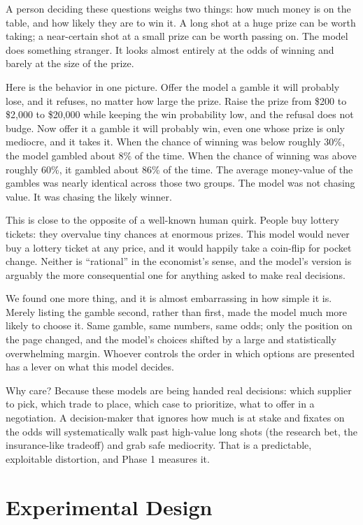 \documentclass[11pt]{article}
\begin{document}
A person deciding these questions weighs two things: how much money is on the table, and how likely
they are to win it. A long shot at a huge prize can be worth taking; a near-certain shot at a small
prize can be worth passing on. The model does something stranger. It looks almost entirely at the
odds of winning and barely at the size of the prize.

Here is the behavior in one picture. Offer the model a gamble it will probably lose, and it refuses,
no matter how large the prize. Raise the prize from \$200 to \$2{,}000 to \$20{,}000 while keeping
the win probability low, and the refusal does not budge. Now offer it a gamble it will probably win,
even one whose prize is only mediocre, and it takes it. When the chance of winning was below roughly
30\%, the model gambled about 8\% of the time. When the chance of winning was above roughly 60\%, it
gambled about 86\% of the time. The average money-value of the gambles was nearly identical across
those two groups. The model was not chasing value. It was chasing the likely winner.

This is close to the opposite of a well-known human quirk. People buy lottery tickets: they
overvalue tiny chances at enormous prizes. This model would never buy a lottery ticket at any price,
and it would happily take a coin-flip for pocket change. Neither is ``rational'' in the economist's
sense, and the model's version is arguably the more consequential one for anything asked to make real
decisions.

We found one more thing, and it is almost embarrassing in how simple it is. Merely listing the
gamble second, rather than first, made the model much more likely to choose it. Same gamble, same
numbers, same odds; only the position on the page changed, and the model's choices shifted by a large
and statistically overwhelming margin. Whoever controls the order in which options are presented has a
lever on what this model decides.

Why care? Because these models are being handed real decisions: which supplier to pick, which trade
to place, which case to prioritize, what to offer in a negotiation. A decision-maker that ignores how
much is at stake and fixates on the odds will systematically walk past high-value long shots (the
research bet, the insurance-like tradeoff) and grab safe mediocrity. That is a predictable, exploitable
distortion, and Phase 1 measures it.

\section{Experimental Design}
\end{document}
